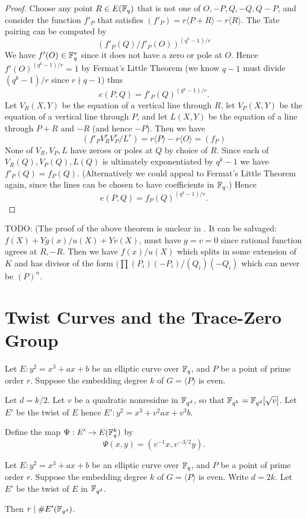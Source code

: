 \begin{proof}
Choose any point $R \in E(\mathbb{F}_q)$ that is not one of
$O, -P, Q, -Q, Q - P$,
and consider the function $f'_P$ that satisfies $(f'_P) = r\langle P+R\rangle
- r\langle R \rangle$.
The Tate pairing can be computed by
\[
(f'_P(Q)/f'_P(O))^{(q^k-1)/r}
\]
We have $f'(O) \in \mathbb{F}_q^*$ since it does not have a zero or pole
at $O$. Hence
$f'(O)^{(q^k-1)/r} = 1$ by Fermat's Little Theorem (we know $q-1$ must
divide $(q^k - 1)/r$ since $r\nmid q-1$) thus
\[ e(P,Q) = f'_P(Q)^{(q^k-1)/r} . \]
Let $V_R(X,Y)$ be the equation of a vertical line through $R$,
let $V_P(X,Y)$ be the equation of a vertical line through $P$,
and let $L(X,Y)$ be the equation of a line through $P+R$ and $-R$ (and hence
$-P$).
Then we have
\[ (f'_P V_R^r V_P^r / L^r) = r \langle P \rangle - r \langle O \rangle
= (f_P) \]
None of $V_R, V_P, L$ have zeroes or poles at $Q$ by choice of $R$.
Since each of $V_R(Q), V_P(Q), L(Q)$ is ultimately exponentiated by $q^k-1$
we have $f'_P(Q) = f_P(Q)$.
(Alternatively we could appeal to Fermat's Little Theorem
again, since the lines can be chosen to have coefficients in $\mathbb{F}_q$.)
Hence
\[e(P,Q) = f_P(Q)^{(q^k-1)/r} . \]
\end{proof}

TODO:
(The proof of the above theorem is unclear in \cite{barreto}.
It can be salvaged: $f(X) + Y g(x) / u(X) + Y v(X)$, must have $g = v = 0$
since rational function agrees at $R, -R$. Then we have $f(x) / u(X)$
which splits in some extension of $K$ and
has divisor of the form $(\prod (P_i)(-P_i) / (Q_i)(-Q_i)$ which can
never be $(P)^n$.

\section {Twist Curves and the Trace-Zero Group}

Let $E : y^2 = x^3 + a x + b$ be an elliptic curve over $\mathbb{F}_q$,
and $P$ be a point of prime order $r$.
Suppose the embedding degree $k$ of $G = \langle P \rangle$ is even.

Let $d = k / 2$. Let $v$ be a quadratic nonresidue in $\mathbb{F}_{q^d}$,
so that $\mathbb{F}_{q^k} = \mathbb{F}_{q^d}[\sqrt{v}]$.
Let $E'$ be the twist of $E$ hence
$E' : y^2 = x^3 + v^2 a x + v^3 b$.

Define the map $\Psi:E'\rightarrow E(\mathbb{F}_q^k)$ by
\[ \Psi(x,y) = (v^{-1}x, v^{-3/2}y) . \]

\begin{theorem}
Let $E : y^2 = x^3 + a x + b$ be an elliptic curve over $\mathbb{F}_q$,
and $P$ be a point of prime order $r$.
Suppose the embedding degree $k$ of $G = \langle P \rangle$ is even.
Write $d = 2k$. Let $E'$ be the twist of $E$ in $\mathbb{F}_{q^d}$.

Then $r \mid \#E'(\mathbb{F}_{q^d})$.
\end{theorem}

